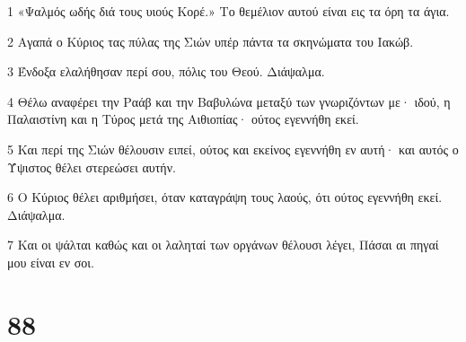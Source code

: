 \par 1 «Ψαλμός ωδής διά τους υιούς Κορέ.» Το θεμέλιον αυτού είναι εις τα όρη τα άγια.
\par 2 Αγαπά ο Κύριος τας πύλας της Σιών υπέρ πάντα τα σκηνώματα του Ιακώβ.
\par 3 Ένδοξα ελαλήθησαν περί σου, πόλις του Θεού. Διάψαλμα.
\par 4 Θέλω αναφέρει την Ραάβ και την Βαβυλώνα μεταξύ των γνωριζόντων με· ιδού, η Παλαιστίνη και η Τύρος μετά της Αιθιοπίας· ούτος εγεννήθη εκεί.
\par 5 Και περί της Σιών θέλουσιν ειπεί, ούτος και εκείνος εγεννήθη εν αυτή· και αυτός ο Ύψιστος θέλει στερεώσει αυτήν.
\par 6 Ο Κύριος θέλει αριθμήσει, όταν καταγράψη τους λαούς, ότι ούτος εγεννήθη εκεί. Διάψαλμα.
\par 7 Και οι ψάλται καθώς και οι λαληταί των οργάνων θέλουσι λέγει, Πάσαι αι πηγαί μου είναι εν σοι.

\chapter{88}

